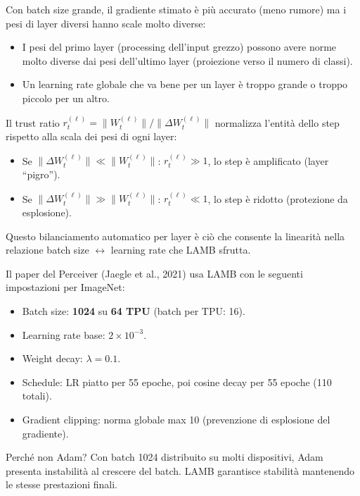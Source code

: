 \documentclass[
  11pt,
]{article}
\begin{document}
\begin{notabox}[title={\textbf{Perché il trust ratio abilita il large batch training?}}]
Con batch size grande, il gradiente stimato è più accurato (meno rumore) ma i pesi di layer diversi hanno scale molto diverse:
\begin{itemize}
  \item I pesi del primo layer (processing dell'input grezzo) possono avere norme molto diverse dai pesi dell'ultimo layer (proiezione verso il numero di classi).
  \item Un learning rate globale che va bene per un layer è troppo grande o troppo piccolo per un altro.
\end{itemize}
Il trust ratio $r_t^{(\ell)} = \|W_t^{(\ell)}\| / \|\Delta W_t^{(\ell)}\|$ normalizza l'entità dello step rispetto alla scala dei pesi di ogni layer:
\begin{itemize}
  \item Se $\|\Delta W_t^{(\ell)}\| \ll \|W_t^{(\ell)}\|$: $r_t^{(\ell)} \gg 1$, lo step è amplificato (layer ``pigro'').
  \item Se $\|\Delta W_t^{(\ell)}\| \gg \|W_t^{(\ell)}\|$: $r_t^{(\ell)} \ll 1$, lo step è ridotto (protezione da esplosione).
\end{itemize}
Questo bilanciamento automatico per layer è ciò che consente la linearità nella relazione batch size $\leftrightarrow$ learning rate che LAMB sfrutta.
\end{notabox}

\begin{notabox}[title={\textbf{LAMB nel Perceiver IO}}]
Il paper del Perceiver (Jaegle et al., 2021) usa LAMB con le seguenti impostazioni per ImageNet:
\begin{itemize}
  \item Batch size: \textbf{1024} su \textbf{64 TPU} (batch per TPU: 16).
  \item Learning rate base: $2 \times 10^{-3}$.
  \item Weight decay: $\lambda = 0.1$.
  \item Schedule: LR piatto per 55 epoche, poi cosine decay per 55 epoche (110 totali).
  \item Gradient clipping: norma globale max 10 (prevenzione di esplosione del gradiente).
\end{itemize}
Perché non Adam? Con batch 1024 distribuito su molti dispositivi, Adam presenta instabilità al crescere del batch. LAMB garantisce stabilità mantenendo le stesse prestazioni finali.
\end{notabox}
\end{document}
